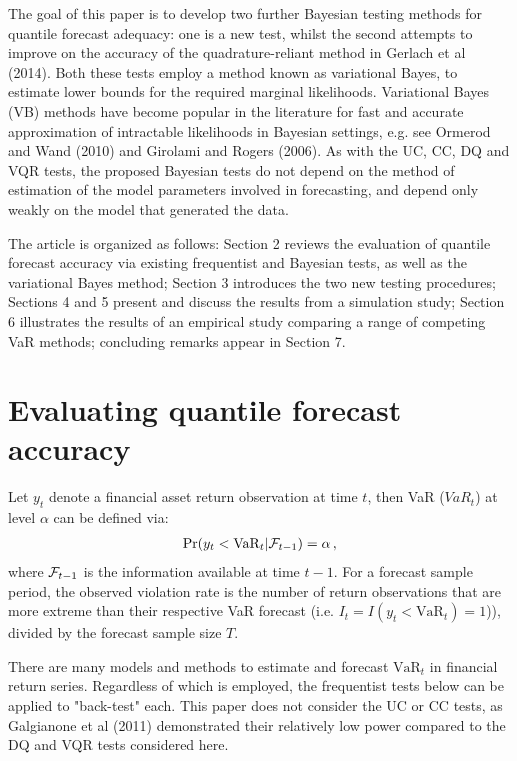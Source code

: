 \documentclass[12pt,epsf]{article}
\newcommand{\calF}{{\cal F}}
\begin{document}
The goal of this paper is to develop two further Bayesian testing methods for quantile forecast adequacy: one is a new test,
whilst the second attempts to improve on the accuracy of the quadrature-reliant method in Gerlach et al (2014). Both these tests
employ a method known as variational Bayes, to estimate lower bounds for the required marginal likelihoods. Variational Bayes (VB)
methods have become popular in the literature for fast and accurate approximation of intractable likelihoods in Bayesian settings,
e.g. see Ormerod and Wand (2010) and Girolami and Rogers (2006). As with the UC, CC, DQ and VQR tests, the proposed Bayesian tests
do not depend on the method of estimation of the model parameters involved in forecasting, and depend only weakly on the model that
generated the data.

The article is organized as follows: Section 2 reviews the evaluation of quantile forecast accuracy via existing frequentist
and Bayesian tests, as well as the variational Bayes method; Section 3 introduces the two new testing procedures;
Sections 4 and 5 present and discuss the results from a simulation study; Section 6 illustrates the results of an
empirical study comparing a range of competing VaR methods; concluding remarks appear in Section 7.

\section{Evaluating quantile forecast accuracy}
Let $y_t$ denote a financial asset return observation at time $t$, then VaR ($VaR_t$) at level $\alpha$ can be defined via:
\begin{eqnarray*}
\textrm{Pr}(y_t < \mbox{VaR}_t|\calF_{t-1}) = \alpha \, ,
\end{eqnarray*}
where $\calF_{t-1}$ is the information available at time $t-1$. For a forecast sample period, the
observed violation rate is the number of return observations that are more extreme than their
respective VaR forecast (i.e. $I_t = I(y_{t}< \mbox{VaR}_{t})=1$)), divided by the forecast sample size $T$.

There are many models and methods to estimate and forecast $\mbox{VaR}_{t}$ in financial return series. Regardless of which is employed,
the frequentist tests below can be applied to "back-test" each. This paper does not consider the UC or CC tests, as Galgianone et al (2011)
demonstrated their relatively low power compared to the DQ and VQR tests considered here.
\end{document}
